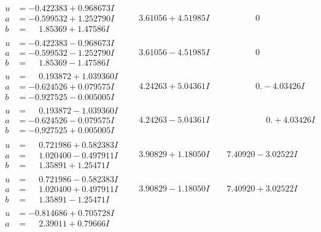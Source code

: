 \documentclass[1p]{elsarticle_modified}
\theoremstyle{definition}
\begin{document}
$$\begin{array}{c|c|c}
\begin{aligned}
u &= -0.422383 + 0.968673 I \\
a &= -0.599532 + 1.252790 I \\
b &= \phantom{-}1.85369 + 1.47586 I\end{aligned}
 & \phantom{-}3.61056 + 4.51985 I & \phantom{-0.000000 } 0 \\ \hline\begin{aligned}
u &= -0.422383 - 0.968673 I \\
a &= -0.599532 - 1.252790 I \\
b &= \phantom{-}1.85369 - 1.47586 I\end{aligned}
 & \phantom{-}3.61056 - 4.51985 I & \phantom{-0.000000 } 0 \\ \hline\begin{aligned}
u &= \phantom{-}0.193872 + 1.039360 I \\
a &= -0.624526 + 0.079575 I \\
b &= -0.927525 - 0.005005 I\end{aligned}
 & \phantom{-}4.24263 + 5.04361 I & \phantom{-0.000000 } 0. - 4.03426 I \\ \hline\begin{aligned}
u &= \phantom{-}0.193872 - 1.039360 I \\
a &= -0.624526 - 0.079575 I \\
b &= -0.927525 + 0.005005 I\end{aligned}
 & \phantom{-}4.24263 - 5.04361 I & \phantom{-0.000000 -}0. + 4.03426 I \\ \hline\begin{aligned}
u &= \phantom{-}0.721986 + 0.582383 I \\
a &= \phantom{-}1.020400 - 0.497911 I \\
b &= \phantom{-}1.35891 + 1.25471 I\end{aligned}
 & \phantom{-}3.90829 + 1.18050 I & \phantom{-}7.40920 - 3.02522 I \\ \hline\begin{aligned}
u &= \phantom{-}0.721986 - 0.582383 I \\
a &= \phantom{-}1.020400 + 0.497911 I \\
b &= \phantom{-}1.35891 - 1.25471 I\end{aligned}
 & \phantom{-}3.90829 - 1.18050 I & \phantom{-}7.40920 + 3.02522 I \\ \hline\begin{aligned}
u &= -0.814686 + 0.705728 I \\
a &= \phantom{-}2.39011 + 0.79666 I \\

\end{aligned}
\end{array}$$
\end{document}
